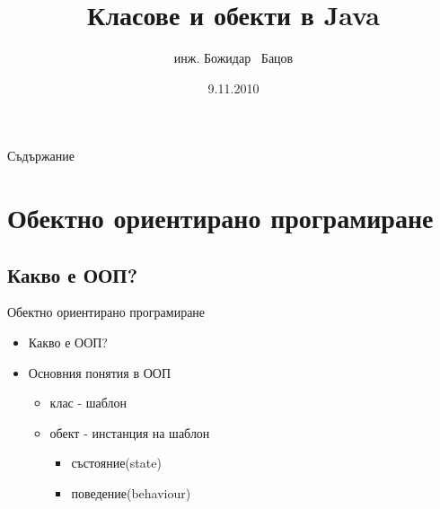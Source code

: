 \documentclass{beamer}
\title{Класове и обекти в Java}
\author{инж. Божидар ~Бацов}
\institute{Drow Ltd.}
\date{9.11.2010}
\begin{document}
\begin{frame}
  \titlepage
\end{frame}

\begin{frame}{Съдържание}
  \tableofcontents[pausesections]
\end{frame}


\section{Обектно ориентирано програмиране}

\subsection{Какво е ООП?}

\begin{frame}{Обектно ориентирано програмиране}
  \transdissolve
  \begin{itemize}
  \item Какво е ООП?
  \item Основния понятия в ООП
    \begin{itemize}
      \item клас - шаблон
      \item обект - инстанция на шаблон
        \begin{itemize}
          \item състояние(state)
          \item поведение(behaviour)
        \end{itemize}
    \end{itemize}
  \end{itemize}
\end{frame}
\end{document}
